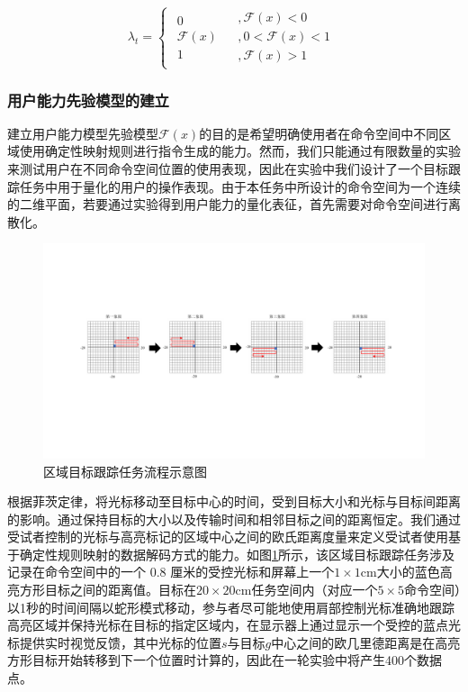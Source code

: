 \begin{equation}
    \label{ex9}
    {\lambda _t} = \left \{{\begin{array}{*{20}{c}}
        {\begin{array}{*{20}{c}}
        0  \\  
        {\mathcal{F} (x)}  \\  
        1 
      \end{array}}&{\begin{array}{*{20}{c}}
        {,\mathcal{F} (x) < 0}  \\  
        {,0 < \mathcal{F} (x) < 1}  \\  
        {,\mathcal{F} (x) > 1} 
      \end{array}} 
      \end{array}} \right.
\end{equation}     

\subsubsection{用户能力先验模型的建立}建立用户能力模型先验模型$\mathcal{F}(x)$的目的是希望明确使用者在命令空间中不同区域使用确定性映射规则进行指令生成的能力。然而，我们只能通过有限数量的实验来测试用户在不同命令空间位置的使用表现，因此在实验中我们设计了一个目标跟踪任务中用于量化的用户的操作表现。由于本任务中所设计的命令空间为一个连续的二维平面，若要通过实验得到用户能力的量化表征，首先需要对命令空间进行离散化。  
\begin{figure}[htb]
    \includegraphics[width=1\textwidth]{figures/3-Fig-10.pdf}
    \caption{区域目标跟踪任务流程示意图}
    \label{fig:3-10}
\end{figure}  

根据菲茨定律\cite{tangFittsLawModulated2018}，将光标移动至目标中心的时间，受到目标大小和光标与目标间距离的影响。通过保持目标的大小以及传输时间和相邻目标之间的距离恒定。我们通过受试者控制的光标与高亮标记的区域中心之间的欧氏距离度量来定义受试者使用基于确定性规则映射的数据解码方式的能力。如图\ref{fig:3-10}所示，该区域目标跟踪任务涉及记录在命令空间中的一个 0.8 厘米的受控光标和屏幕上一个$1\times1$cm大小的蓝色高亮方形目标之间的距离值。目标在$20\times20$cm任务空间内（对应一个$5\times5$命令空间）以1秒的时间间隔以蛇形模式移动，参与者尽可能地使用肩部控制光标准确地跟踪高亮区域并保持光标在目标的指定区域内，在显示器上通过显示一个受控的蓝点光标提供实时视觉反馈，其中光标的位置$s$与目标$g$中心之间的欧几里德距离是在高亮方形目标开始转移到下一个位置时计算的，因此在一轮实验中将产生400个数据点。

